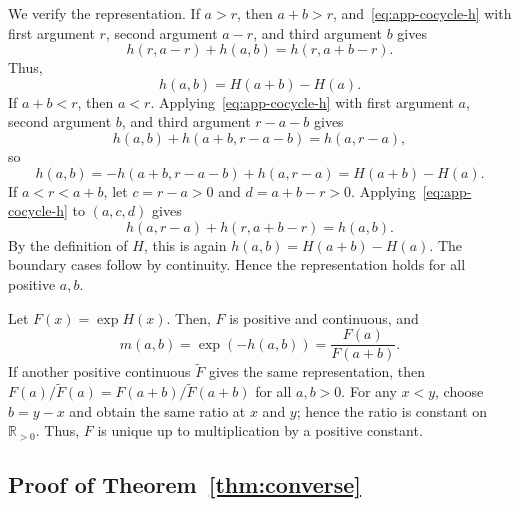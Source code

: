 \documentclass[runningheads]{llncs}
\newcommand{\R}{\mathbb{R}}
\begin{document}
We verify the representation. If $a>r$, then $a+b>r$, and~\eqref{eq:app-cocycle-h} with first argument $r$, second argument $a-r$, and third argument $b$ gives
\begin{equation*}
  h(r,a-r)+h(a,b)=h(r,a+b-r).
\end{equation*}
Thus,
\begin{equation*}
  h(a,b)=H(a+b)-H(a).
\end{equation*}
If $a+b<r$, then $a<r$. Applying~\eqref{eq:app-cocycle-h} with first argument $a$, second argument $b$, and third argument $r-a-b$ gives
\begin{equation*}
  h(a,b)+h(a+b,r-a-b)=h(a,r-a),
\end{equation*}
so
\begin{equation*}
  h(a,b)=-h(a+b,r-a-b)+h(a,r-a)=H(a+b)-H(a).
\end{equation*}
If $a<r<a+b$, let $c=r-a>0$ and $d=a+b-r>0$. Applying~\eqref{eq:app-cocycle-h} to $(a,c,d)$ gives
\begin{equation*}
  h(a,r-a)+h(r,a+b-r)=h(a,b).
\end{equation*}
By the definition of $H$, this is again $h(a,b)=H(a+b)-H(a)$. The boundary cases follow by continuity. Hence the representation holds for all positive $a,b$.

Let $F(x)=\exp H(x)$. Then, $F$ is positive and continuous, and
\begin{equation*}
  m(a,b)=\exp(-h(a,b))=\frac{F(a)}{F(a+b)}.
\end{equation*}
If another positive continuous $\widetilde F$ gives the same representation, then $F(a)/\widetilde F(a)=F(a+b)/\widetilde F(a+b)$ for all $a,b>0$. For any $x<y$, choose $b=y-x$ and obtain the same ratio at $x$ and $y$; hence the ratio is constant on $\R_{>0}$. Thus, $F$ is unique up to multiplication by a positive constant.

\subsection*{Proof of Theorem~\ref{thm:converse}}
\end{document}
